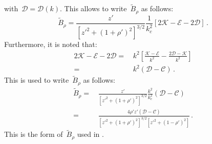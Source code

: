 with~$\mathcal{D} = \mathcal{D}(k)$.
This allows to write~$\tilde{B}_\rho$ as follows:
\begin{equation}
  \tilde{B}_\rho = \frac{z'}{\left[ z'^2 + (1 + \rho')^2 \right]^{3/2}} \frac{1}{k_c^2} \left[ 2 \mathcal{K} - \mathcal{E} - 2 \mathcal{D} \right] \, .
\end{equation}
Furthermore, it is noted that:
\begin{align}
      2 \mathcal{K} - \mathcal{E} - 2 \mathcal{D}
 =&\, k^2 \left[ \frac{\mathcal{K} - \mathcal{E}}{k^2} - \frac{2 \mathcal{D} - \mathcal{K}}{k^2} \right] \nonumber \\
 =&\, k^2 \left(  \mathcal{D} - \mathcal{C} \right) \, .
\end{align}
This is used to write~$\tilde{B}_\rho$ as follows:
\begin{align}
  \tilde{B}_\rho
 =&\, \frac{z'}{\left[ z'^2 + (1 + \rho')^2 \right]^{3/2}} \frac{k^2}{k_c^2} \left(  \mathcal{D} - \mathcal{C} \right) \nonumber \\
 =&\, \frac{4 \rho' z' \left(  \mathcal{D} - \mathcal{C} \right) }{\left[ z'^2 + (1 + \rho')^2 \right]^{3/2} \left[ z'^2 + (1 - \rho')^2 \right]} \, .
\end{align}
This is the form of~$\tilde{B}_\rho$ used in .


